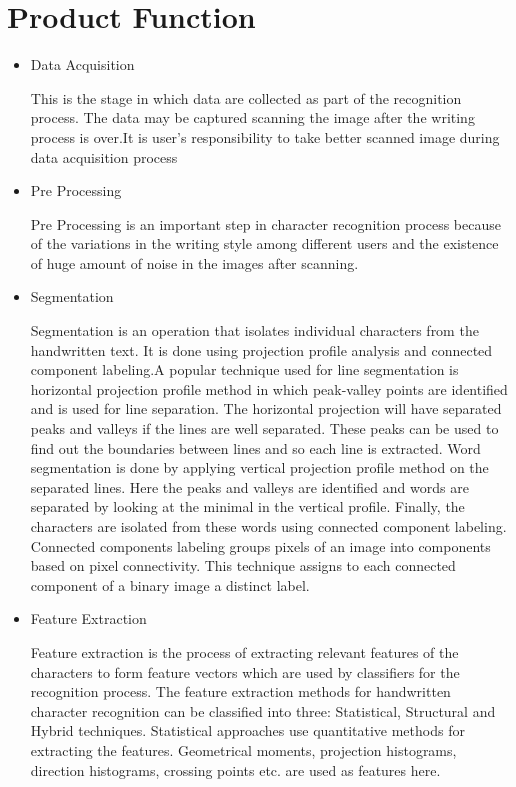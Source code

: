 \documentclass[12pt,a4paper,oneside]{report}
\begin{document}
\section{Product Function}
\begin{itemize}
\item Data Acquisition
\par This is the stage in which data are collected as part of the recognition process. The data
may be captured scanning the image after the writing process is over.It is user's responsibility to take
better scanned image during data acquisition process
\item Pre Processing
\par Pre Processing is an important step in character recognition process because of the variations
in the writing style among different users and the existence of huge amount of noise in the images after
scanning.
\item Segmentation
\par Segmentation is an operation that isolates individual characters from the handwritten text.
It is done using projection profile analysis and connected component labeling.A popular technique used
for line segmentation is horizontal projection profile method in which peak-valley points are identified
and is used for line separation. The horizontal projection will have separated peaks and valleys if the lines
are well separated. These peaks can be used to find out the boundaries between lines and so each line is
extracted. Word segmentation is done by applying vertical projection profile method on the separated
lines. Here the peaks and valleys are identified and words are separated by looking at the minimal in
the vertical profile. Finally, the characters are isolated from these words using connected component
labeling. Connected components labeling groups pixels of an image into components based on pixel
connectivity. This technique assigns to each connected component of a binary image a distinct label.
 \item  Feature Extraction
\par Feature extraction is the process of extracting relevant features of the characters to form
feature vectors which are used by classifiers for the recognition process. The feature extraction methods
for handwritten character recognition can be classified into three: Statistical, Structural and Hybrid
techniques. Statistical approaches use quantitative methods for extracting the features. Geometrical
moments, projection histograms, direction histograms, crossing points etc. are used as features here.

\end{itemize}
\end{document}
